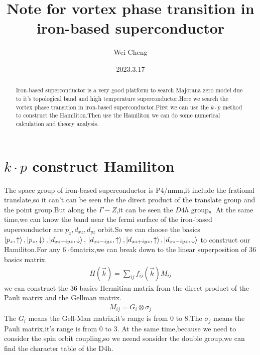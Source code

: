 \documentclass[5pt]{article}
\title{\LARGE {Note for vortex phase transition in iron-based superconductor}}
\author{\Large{Wei Cheng}}
\date{\Large{2023.3.17}}
\begin{document}
	\maketitle
	\Large
	\tableofcontents
	\everymath{\displaystyle}
	\begin{abstract}
		\Large
		Iron-based superconductor is a very good platform to search Majorana zero model due to it's topological band and high temperature superconductor.Here we search the vortex phase transition in iron-based superconductor.First we can use the $k\cdot p$ method to construct the Hamiliton.Then use the Hamiliton we can do some numerical calculation and theory analysis.
	\end{abstract}
\section{$k\cdot p$ construct Hamiliton}
The space group of iron-based superconductor is P4/nmm,it include the frational translate,so it can't can be seen the the direct product of the translate group and the point group.But along the $\Gamma-Z$,it can be seen the $D4h$ group。At the same time,we can know the band near the fermi surface of the iron-based superconductor are $p_z,d_{xz},d_{yz}$ orbit.So we can choose the basics $\ket{p_z,\uparrow},\ket{p_z,\downarrow},\ket{d_{xz+iyz},\downarrow},\\
\ket{d_{xz-iyz},\uparrow},\ket{d_{xz+iyz},\uparrow},\ket{d_{xz-iyz},\downarrow}$ to construct our Hamiliton.For any $6\cdot 6$matrix,we can break down to the linear superposition of 36 basics matrix.
\begin{align}
	H(\vec{k})=\sum_{ij}f_{ij}(\vec{k})M_{ij}
\end{align}
we can construct the 36 basics Hermitian matrix from the direct product of the Pauli matrix and the Gellman matrix.
\begin{align}
	M_{ij}=G_i\otimes \sigma_j
\end{align}
The $G_i$ means the Gell-Man matrix,it's range is from 0 to 8.The $\sigma_j$ means the Pauli matrix,it's range is from 0 to 3. 
At the same time,because we need to consider the spin orbit coupling,so we neend sonsider the double group,we can find the character table of the D4h.
\end{document}
